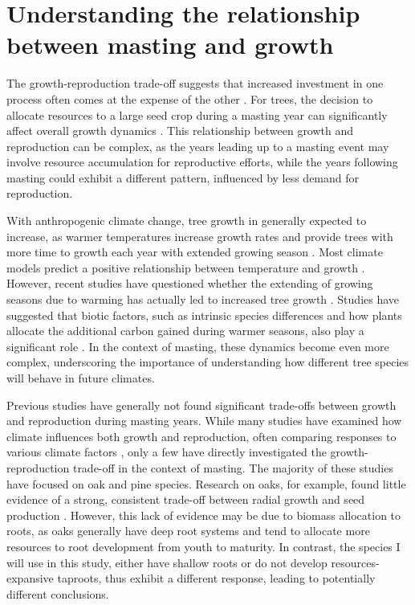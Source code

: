 \documentclass[11pt,letter]{article}
\begin{document}
\section{Understanding the relationship between masting and growth}
The growth-reproduction trade-off suggests that increased investment in one process often comes at the expense of the other \citep{grime1977evidence, stearns1998evolution}. For trees, the decision to allocate resources to a large seed crop during a masting year can significantly affect overall growth dynamics \citep{hacket2016tree}. This relationship between growth and reproduction can be complex, as the years leading up to a masting event may involve resource accumulation for reproductive efforts, while the years following masting could exhibit a different pattern, influenced by less demand for reproduction.\par
With anthropogenic climate change, tree growth in generally expected to increase, as warmer temperatures increase growth rates and provide trees with more time to growth each year with extended growing season \citep{keenan2014net, finzi2020carbon}. Most climate models predict a positive relationship between temperature and growth \citep{ito2020global, friedlingstein2022global}. However, recent studies have questioned whether the extending of growing seasons due to warming has actually led to increased tree growth \citep{dow2022warm, green2022limits}. Studies have suggested that biotic factors, such as intrinsic species differences and how plants allocate the additional carbon gained during warmer seasons, also play a significant role \citep{hacket2016consistent}. In the context of masting,  these dynamics become even more complex, underscoring the importance of understanding how different tree species will behave in future climates.\par
Previous studies have generally not found significant trade-offs between growth and reproduction during masting years. While many studies have examined how climate influences both growth and reproduction, often comparing responses to various climate factors \citep{koenig2020can, bajocco2021characterizing, redmond2019resource, sanchez2011trade}, only a few have directly investigated the growth-reproduction trade-off in the context of masting. The majority of these studies have focused on oak and pine species. Research on oaks, for example, found little evidence of a strong, consistent trade-off between radial growth and seed production \citep{koenig2020can, patterson2023acorn}. However, this lack of evidence may be due to biomass allocation to roots, as oaks generally have deep root systems and tend to allocate more resources to root development from youth to maturity. In contrast, the species I will use in this study, either have shallow roots or do not develop resources-expansive taproots, thus exhibit a different response, leading to potentially different conclusions.\par
\end{document}

